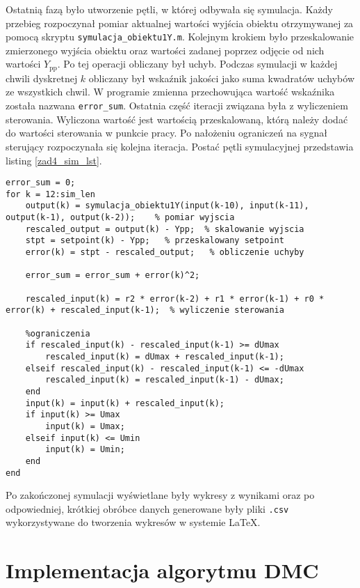 Ostatnią fazą było utworzenie pętli, w której odbywała się symulacja. Każdy przebieg rozpoczynał pomiar aktualnej wartości wyjścia obiektu otrzymywanej za pomocą skryptu \verb+symulacja_obiektu1Y.m+. Kolejnym krokiem było przeskalowanie zmierzonego wyjścia obiektu oraz wartości zadanej poprzez odjęcie od nich wartości $Y_{\mathrm{pp}}$. Po tej operacji obliczany był uchyb. Podczas symulacji w każdej chwili dyskretnej $k$ obliczany był wskaźnik jakości jako suma kwadratów uchybów ze wszystkich chwil. W programie zmienna przechowująca wartość wskaźnika została nazwana \verb+error_sum+. Ostatnia część iteracji związana była z wyliczeniem sterowania. Wyliczona wartość jest wartością przeskalowaną, którą należy dodać do wartości sterowania w punkcie pracy. Po nałożeniu ograniczeń na sygnał sterujący rozpoczynała się kolejna iteracja. Postać pętli symulacyjnej przedstawia listing \ref{zad4_sim_lst}.\\ 
\begin{lstlisting}[style=custommatlab,frame=single,label={zad4_sim_lst},caption={Petla symulujaca dzialanie cyfrowego algorytmu PID},captionpos=b]
error_sum = 0;
for k = 12:sim_len     
    output(k) = symulacja_obiektu1Y(input(k-10), input(k-11), output(k-1), output(k-2));    % pomiar wyjscia
    rescaled_output = output(k) - Ypp;  % skalowanie wyjscia   
    stpt = setpoint(k) - Ypp;   % przeskalowany setpoint
    error(k) = stpt - rescaled_output;   % obliczenie uchyby   
    
    error_sum = error_sum + error(k)^2;
    
    rescaled_input(k) = r2 * error(k-2) + r1 * error(k-1) + r0 * error(k) + rescaled_input(k-1);  % wyliczenie sterowania 
  
    %ograniczenia  
    if rescaled_input(k) - rescaled_input(k-1) >= dUmax
        rescaled_input(k) = dUmax + rescaled_input(k-1);
    elseif rescaled_input(k) - rescaled_input(k-1) <= -dUmax
        rescaled_input(k) = rescaled_input(k-1) - dUmax;
    end   
    input(k) = input(k) + rescaled_input(k);
    if input(k) >= Umax
        input(k) = Umax;
    elseif input(k) <= Umin
        input(k) = Umin;
    end 
end
\end{lstlisting}

Po zakończonej symulacji wyświetlane były wykresy z wynikami oraz po odpowiedniej, krótkiej obróbce danych generowane były pliki \verb+.csv+ wykorzystywane do tworzenia wykresów w systemie \LaTeX.


\section{Implementacja algorytmu DMC}
\label{zad4_dmc}

